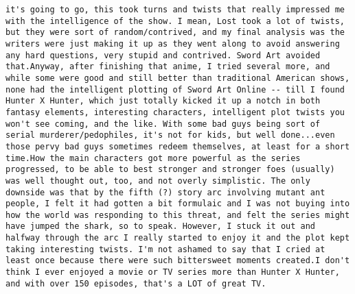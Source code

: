 \documentclass[
]{article}
\begin{document}
\begin{verbatim}
it's going to go, this took turns and twists that really impressed me with the intelligence of the show. I mean, Lost took a lot of twists, but they were sort of random/contrived, and my final analysis was the writers were just making it up as they went along to avoid answering any hard questions, very stupid and contrived. Sword Art avoided that.Anyway, after finishing that anime, I tried several more, and while some were good and still better than traditional American shows, none had the intelligent plotting of Sword Art Online -- till I found Hunter X Hunter, which just totally kicked it up a notch in both fantasy elements, interesting characters, intelligent plot twists you won't see coming, and the like. With some bad guys being sort of serial murderer/pedophiles, it's not for kids, but well done...even those pervy bad guys sometimes redeem themselves, at least for a short time.How the main characters got more powerful as the series progressed, to be able to best stronger and stronger foes (usually) was well thought out, too, and not overly simplistic. The only downside was that by the fifth (?) story arc involving mutant ant people, I felt it had gotten a bit formulaic and I was not buying into how the world was responding to this threat, and felt the series might have jumped the shark, so to speak. However, I stuck it out and halfway through the arc I really started to enjoy it and the plot kept taking interesting twists. I'm not ashamed to say that I cried at least once because there were such bittersweet moments created.I don't think I ever enjoyed a movie or TV series more than Hunter X Hunter, and with over 150 episodes, that's a LOT of great TV.

\end{verbatim}
\end{document}
